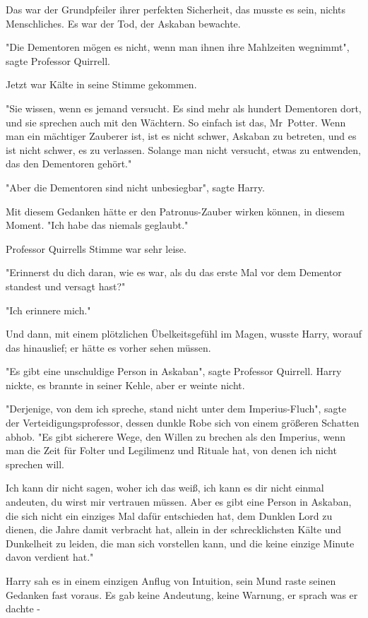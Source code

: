 {Das war der Grundpfeiler ihrer perfekten Sicherheit, das musste es sein, nichts Menschliches. Es war der Tod, der Askaban bewachte.

"Die Dementoren mögen es nicht, wenn man ihnen ihre Mahlzeiten wegnimmt", sagte Professor Quirrell.

Jetzt war Kälte in seine Stimme gekommen.

"Sie wissen, wenn es jemand versucht. Es sind mehr als hundert Dementoren dort, und sie sprechen auch mit den Wächtern. So einfach ist das, Mr~Potter. Wenn man ein mächtiger Zauberer ist, ist es nicht schwer, Askaban zu betreten, und es ist nicht schwer, es zu verlassen. Solange man nicht versucht, etwas zu entwenden, das den Dementoren gehört."

"Aber die Dementoren sind nicht unbesiegbar", sagte Harry.

Mit diesem Gedanken hätte er den Patronus-Zauber wirken können, in diesem Moment. "Ich habe das niemals geglaubt."

Professor Quirrells Stimme war sehr leise.

"Erinnerst du dich daran, wie es war, als du das erste Mal vor dem Dementor standest und versagt hast?"

"Ich erinnere mich."

Und dann, mit einem plötzlichen Übelkeitsgefühl im Magen, wusste Harry, worauf das hinauslief; er hätte es vorher sehen müssen.

"Es gibt eine unschuldige Person in Askaban", sagte Professor Quirrell. Harry nickte, es brannte in seiner Kehle, aber er weinte nicht.

"Derjenige, von dem ich spreche, stand nicht unter dem Imperius-Fluch", sagte der Verteidigungsprofessor, dessen dunkle Robe sich von einem größeren Schatten abhob. "Es gibt sicherere Wege, den Willen zu brechen als den Imperius, wenn man die Zeit für Folter und Legilimenz und Rituale hat, von denen ich nicht sprechen will.

Ich kann dir nicht sagen, woher ich das weiß, ich kann es dir nicht einmal andeuten, du wirst mir vertrauen müssen. Aber es gibt eine Person in Askaban, die sich nicht ein einziges Mal dafür entschieden hat, dem Dunklen Lord zu dienen, die Jahre damit verbracht hat, allein in der schrecklichsten Kälte und Dunkelheit zu leiden, die man sich vorstellen kann, und die keine einzige Minute davon verdient hat."

Harry sah es in einem einzigen Anflug von Intuition, sein Mund raste seinen Gedanken fast voraus. Es gab keine Andeutung, keine Warnung, er sprach was er dachte -

}

